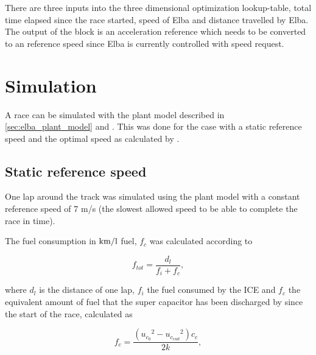 There are three inputs into the three dimensional optimization lookup-table, total time elapsed since the race started, speed of Elba and distance travelled by Elba.%
The output of the block is an acceleration reference which needs to be converted to an reference speed since Elba is
currently controlled with speed request. 

\section{Simulation}
A race can be simulated with the plant model described in \ref{sec:elba_plant_model} and \cite{elba2015}. This was done for the case with a static reference speed and the optimal speed as calculated by \cite{liu2016}.

\subsection{Static reference speed}\label{sec:opt_sim_static}
One lap around the track was simulated using the plant model with a constant reference speed of 7 m/s (the slowest allowed speed to be able to complete the race in time). %


The fuel consumption in $\textnormal{km/l}$ fuel, $f_c$ was calculated according to

\begin{equation} \label{eq:optimization_fuelconsumption}
	f_{tot} = \frac{d_l}{f_i+f_c},
\end{equation}

where $d_l$ is the distance of one lap, $f_i$ the fuel consumed by the ICE and
$f_c$ the equivalent amount of fuel that the super capacitor has been discharged
by since the start of the race, calculated as

\begin{equation} \label{eq:optimization_ethanolenergy}
	f_c = \frac{({{u_{c_0}}^2-{u_{c_{end}}}^2})c_c}{2k},
\end{equation}

